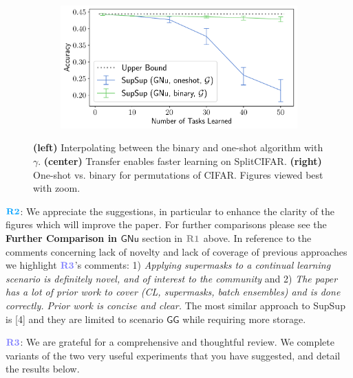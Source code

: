 \documentclass{article}
\newcommand{\casename}[1]{\ensuremath{\mathsf{#1}}\xspace}
\newcommand{\rone}{\textbf{\textcolor{cl11}{R1}}}
\newcommand{\rtwo}{\textbf{{\textcolor{cl6}{R2}}}}
\newcommand{\rthree}{\textbf{{\textcolor{cl10}{R3}}}}
\begin{document}
\begin{figure}
    \begin{subfigure}{0.33\textwidth}
    \centering
    \includegraphics[scale=0.33]{rebuttal/cifarperm.pdf}
    \end{subfigure}
     \label{fig:rf}
    \caption{\textbf{(left)} Interpolating between the binary and one-shot algorithm with $\gamma$. \textbf{(center)} Transfer enables faster learning on SplitCIFAR. \textbf{(right)} One-shot vs. binary for permutations of CIFAR. Figures viewed best with zoom.}
    \vspace*{-1em}
\end{figure}

\noindent \textbf{\textcolor{cl6}{\textbullet}} $\rtwo$: We appreciate the suggestions, in particular to enhance the clarity of the figures which will improve the paper. 
For further comparisons please see the \textbf{Further Comparison in \casename{GNu}} section in $\rone$ above. %
In reference to the comments concerning lack of novelty and lack of coverage of previous approaches we highlight $\rthree$'s comments: 1) \textit{Applying supermasks to a continual learning scenario is definitely novel, and of interest to the community} and 2) \textit{The paper has a lot of prior work to cover (CL, supermasks, batch ensembles) and is done correctly. Prior work is concise and clear.} The most similar approach to SupSup is [4] and they are limited to scenario \casename{GG} while requiring more storage.

\noindent \textbf{\textcolor{cl10}{\textbullet}} $\rthree$: We are grateful for a comprehensive and thoughtful review.
We complete variants of the two very useful experiments that you have suggested, and detail the results below.
\end{document}
